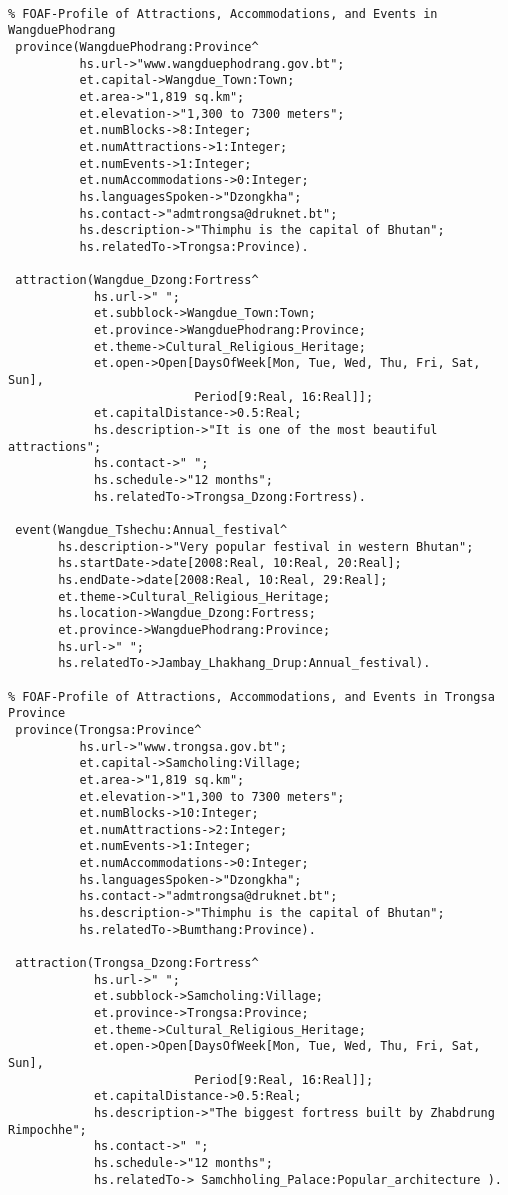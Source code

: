 \begin{verbatim}
                 
% FOAF-Profile of Attractions, Accommodations, and Events in WangduePhodrang 
 province(WangduePhodrang:Province^
          hs.url->"www.wangduephodrang.gov.bt";
          et.capital->Wangdue_Town:Town;
          et.area->"1,819 sq.km";
          et.elevation->"1,300 to 7300 meters";
          et.numBlocks->8:Integer;
          et.numAttractions->1:Integer;
          et.numEvents->1:Integer;
          et.numAccommodations->0:Integer;
          hs.languagesSpoken->"Dzongkha";
          hs.contact->"admtrongsa@druknet.bt";
          hs.description->"Thimphu is the capital of Bhutan";
          hs.relatedTo->Trongsa:Province).

 attraction(Wangdue_Dzong:Fortress^
            hs.url->" ";
            et.subblock->Wangdue_Town:Town;
            et.province->WangduePhodrang:Province;
            et.theme->Cultural_Religious_Heritage;
            et.open->Open[DaysOfWeek[Mon, Tue, Wed, Thu, Fri, Sat, Sun],
                          Period[9:Real, 16:Real]];
            et.capitalDistance->0.5:Real;
            hs.description->"It is one of the most beautiful attractions";
            hs.contact->" ";
            hs.schedule->"12 months";
            hs.relatedTo->Trongsa_Dzong:Fortress).

 event(Wangdue_Tshechu:Annual_festival^
       hs.description->"Very popular festival in western Bhutan";
       hs.startDate->date[2008:Real, 10:Real, 20:Real];
       hs.endDate->date[2008:Real, 10:Real, 29:Real];
       et.theme->Cultural_Religious_Heritage;
       hs.location->Wangdue_Dzong:Fortress;
       et.province->WangduePhodrang:Province;
       hs.url->" ";
       hs.relatedTo->Jambay_Lhakhang_Drup:Annual_festival).
                     
% FOAF-Profile of Attractions, Accommodations, and Events in Trongsa Province
 province(Trongsa:Province^
          hs.url->"www.trongsa.gov.bt";
          et.capital->Samcholing:Village;
          et.area->"1,819 sq.km";
          et.elevation->"1,300 to 7300 meters";
          et.numBlocks->10:Integer;
          et.numAttractions->2:Integer;
          et.numEvents->1:Integer;
          et.numAccommodations->0:Integer;
          hs.languagesSpoken->"Dzongkha";
          hs.contact->"admtrongsa@druknet.bt";
          hs.description->"Thimphu is the capital of Bhutan";
          hs.relatedTo->Bumthang:Province).
   
 attraction(Trongsa_Dzong:Fortress^
            hs.url->" ";
            et.subblock->Samcholing:Village;
            et.province->Trongsa:Province;
            et.theme->Cultural_Religious_Heritage;
            et.open->Open[DaysOfWeek[Mon, Tue, Wed, Thu, Fri, Sat, Sun],
                          Period[9:Real, 16:Real]];
            et.capitalDistance->0.5:Real;
            hs.description->"The biggest fortress built by Zhabdrung Rimpochhe";
            hs.contact->" ";
            hs.schedule->"12 months";
            hs.relatedTo-> Samchholing_Palace:Popular_architecture ).


\end{verbatim}
